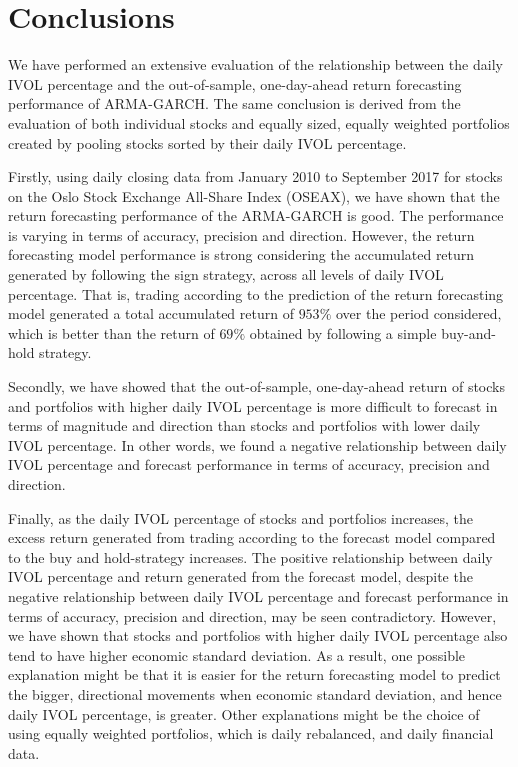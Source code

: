 
\chapter{Conclusions}
\label{Conclusions}

We have performed an extensive evaluation of the relationship between the daily IVOL percentage and the out-of-sample, one-day-ahead return forecasting performance of ARMA-GARCH. The same conclusion is derived from the evaluation of both individual stocks and equally sized, equally weighted portfolios created by pooling stocks sorted by their daily IVOL percentage. 

Firstly, using daily closing data from January 2010 to September 2017 for stocks on the Oslo Stock Exchange All-Share Index (OSEAX), we have shown that the return forecasting performance of the ARMA-GARCH is good. The performance is varying in terms of accuracy, precision and direction. However, the return forecasting model performance is strong considering the accumulated return generated by following the sign strategy, across all levels of daily IVOL percentage. That is, trading according to the prediction of the return forecasting model generated a total accumulated return of $953\%$ over the period considered, which is better than the return of $69\%$ obtained by following a simple buy-and-hold strategy.

Secondly, we have showed that the out-of-sample, one-day-ahead return of stocks and portfolios with higher daily IVOL percentage is more difficult to forecast in terms of magnitude and direction than stocks and portfolios with lower daily IVOL percentage. In other words, we found a negative relationship between daily IVOL percentage and forecast performance in terms of accuracy, precision and direction.

Finally, as the  daily IVOL percentage of stocks and portfolios increases, the excess return generated from trading according to the forecast model compared to the buy and hold-strategy increases. The positive relationship between daily IVOL percentage and return generated from the forecast model, despite the negative relationship between daily IVOL percentage and forecast performance in terms of accuracy, precision and direction, may be seen contradictory. However, we have shown that stocks and portfolios with higher daily IVOL percentage also tend to have higher economic standard deviation. As a result, one possible explanation might be that it is easier for the return forecasting model to predict the bigger, directional movements when economic standard deviation, and hence daily IVOL percentage, is greater. Other explanations might be the choice of using equally weighted portfolios, which is daily rebalanced, and daily financial data.